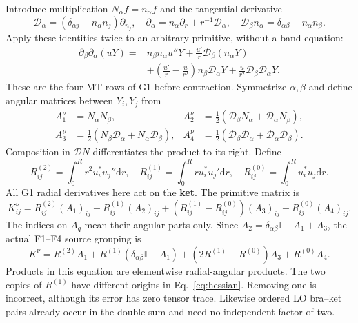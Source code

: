 \documentclass[11pt]{article}
\newcommand{\dd}{\mathrm d}
\newcommand{\Id}{\mathbb I}
\begin{document}
Introduce multiplication $N_\alpha f=n_\alpha f$ and the tangential derivative
\begin{equation}
 \mathcal D_\alpha=(\delta_{\alpha j}-n_\alpha n_j)\partial_{n_j},\quad
 \partial_\alpha=n_\alpha\partial_r+r^{-1}\mathcal D_\alpha,\quad
 \mathcal D_\beta n_\alpha=\delta_{\alpha\beta}-n_\alpha n_\beta.
\end{equation}
Apply these identities twice to an arbitrary primitive, without a band equation:
\begin{align}\label{eq:hessian}
 \partial_\beta\partial_\alpha(uY)={}&n_\beta n_\alpha u''Y
 +\frac{u'}r\mathcal D_\beta(n_\alpha Y)\nonumber\\
 &+\left(\frac{u'}r-\frac{u}{r^2}\right)n_\beta\mathcal D_\alpha Y
 +\frac{u}{r^2}\mathcal D_\beta\mathcal D_\alpha Y .
\end{align}
These are the four MT rows of G1 before contraction. Symmetrize $\alpha,\beta$ and define angular matrices between $Y_i,Y_j$ from
\begin{align}
 A_1^\nu&=N_\alpha N_\beta,&
 A_2^\nu&=\tfrac12(\mathcal D_\beta N_\alpha+\mathcal D_\alpha N_\beta),\\
 A_3^\nu&=\tfrac12(N_\beta\mathcal D_\alpha+N_\alpha\mathcal D_\beta),&
 A_4^\nu&=\tfrac12(\mathcal D_\beta\mathcal D_\alpha+\mathcal D_\alpha\mathcal D_\beta).
\end{align}
Composition in $\mathcal D N$ differentiates the product to its right. Define
\begin{equation}
 R^{(2)}_{ij}=\int_0^Rr^2u_i^*u_j''\dd r,\quad
 R^{(1)}_{ij}=\int_0^Rr u_i^*u_j'\dd r,\quad
 R^{(0)}_{ij}=\int_0^Ru_i^*u_j\dd r.
\end{equation}
All G1 radial derivatives here act on the \textbf{ket}. The primitive matrix is
\begin{equation}\label{eq:g1primitive}
 K^\nu_{ij}=R^{(2)}_{ij}(A_1)_{ij}+R^{(1)}_{ij}(A_2)_{ij}
 +(R^{(1)}_{ij}-R^{(0)}_{ij})(A_3)_{ij}+R^{(0)}_{ij}(A_4)_{ij}.
\end{equation}
The indices on $A_q$ mean their angular parts only. Since
$A_2=\delta_{\alpha\beta}\Id-A_1+A_3$, the actual F1--F4 source grouping is
\begin{equation}\label{eq:g1code}
 \boxed{K^\nu=R^{(2)}A_1+R^{(1)}(\delta_{\alpha\beta}\Id-A_1)
 +(2R^{(1)}-R^{(0)})A_3+R^{(0)}A_4.}
\end{equation}
Products in this equation are elementwise radial-angular products. The two copies of $R^{(1)}$ have different origins in Eq.~\eqref{eq:hessian}. Removing one is incorrect, although its error has zero tensor trace. Likewise ordered LO bra--ket pairs already occur in the double sum and need no independent factor of two.
\end{document}
